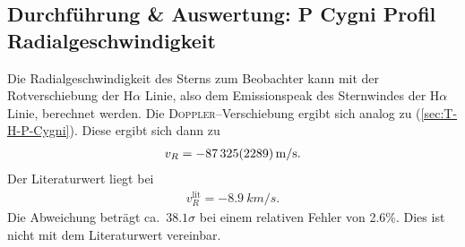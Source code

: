 \subsection{Durchführung \& Auswertung: P Cygni Profil\\Radialgeschwindigkeit}
Die Radialgeschwindigkeit des Sterns zum Beobachter kann mit der Rotverschiebung der H$\alpha $ Linie, also dem Emissionspeak des Sternwindes der H$\alpha $ Linie, berechnet werden.
Die \textsc{Doppler}--Verschiebung ergibt sich analog zu (\ref{sec:T-H-P-Cygni}).
Diese ergibt sich dann zu
\begin{align} 
  v_R=-\SI{87325+-2289}{m/s}
.\end{align}
Der Literaturwert liegt bei\cite{pcygniRadialvelocity}
\begin{align} 
  v_R^\text{lit}=\SI{-8.9}{km/s}
.\end{align} 
Die Abweichung beträgt ca.\ $38.1\sigma $ bei einem relativen Fehler von 2.6\%. %
Dies ist nicht mit dem Literaturwert vereinbar.



